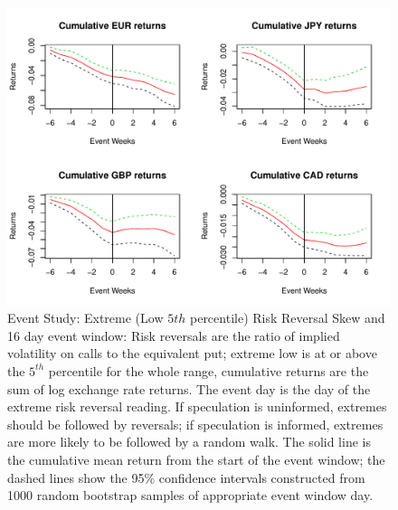 \documentclass[preprint,12pt,authoryear]{elsarticle}
\begin{document}
\begin{figure}
\graphicspath{{../Figures/}}
\centering
\includegraphics[scale=0.8]{FPCum6w}
\caption{Event Study: Extreme (Low $5{th}$ percentile) Risk Reversal Skew and 16 day event window: Risk reversals are the ratio of implied volatility on calls to the equivalent put; extreme low is at or above the $5^{th}$ percentile for the whole range, cumulative returns are the sum of log exchange rate returns. The event day is the day of the extreme risk reversal reading.  If speculation is uninformed, extremes should be followed by reversals; if speculation is informed, extremes are more likely to be followed by a random walk. The solid line is the cumulative mean return from the start of the event window; the dashed lines show the 95\% confidence intervals constructed from 1000 random bootstrap samples of appropriate event window day.}
\label{fig:ES3}
\end{figure}
\end{document}
